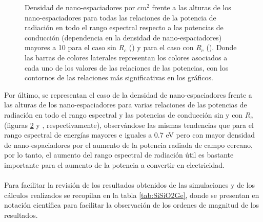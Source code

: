 \begin{figure}[H]
\begin{subfigure}[b]{0.49\textwidth}
			\caption{ }
			\label{fig:rel_SiSiO2Ge_Rc_full}
		\end{subfigure}
	\caption{Densidad de nano-espaciadores por $cm^2$ frente a las alturas de los nano-espaciadores para todas las relaciones de la potencia de radiación en todo el rango espectral respecto a las potencias de conducción (dependencia en la densidad de nano-espaciadores) mayores a 10 para el caso sin $R_c$ () y para el caso con $R_c$ (). Donde las barras de colores laterales representan los colores asociados a cada uno de los valores de las relaciones de las potencias, con los contornos de las relaciones más significativas en los gráficos.}%
	\label{fig:rels_SiSiO2Ge_full}%
\end{figure}
Por último, se representan el caso de la densidad de nano-espaciadores frente a las alturas de los nano-espaciadores para varias relaciones de las potencias de radiación en todo el rango espectral y las potencias de conducción sin y con $R_c$ (figuras \ref{fig:rels_SiSiO2Ge_full}   y , respectivamente), observándose las mismas tendencias que para el rango espectral de energías mayores e iguales a 0.7 eV pero con mayor densidad de nano-espaciadores por el aumento de la potencia radiada de campo cercano, por lo tanto, el aumento del rango espectral de radiación útil es bastante importante para el aumento de la potencia a convertir en electricidad.\\\\
Para facilitar la revisión de los resultados obtenidos de las simulaciones y de los cálculos realizados se recopilan en la tabla \ref{tab:SiSiO2Ge}, donde se presentan en notación científica para facilitar la observación de los ordenes de magnitud de los resultados.
